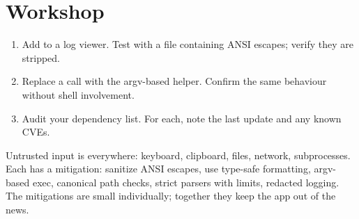 \section*{Workshop}

\begin{enumerate}[leftmargin=*]
  \item Add  to a log viewer. Test with a
    file containing ANSI escapes; verify they are stripped.
  \item Replace a  call with the argv-based
     helper. Confirm the same behaviour without
    shell involvement.
  \item Audit your dependency list. For each, note the last
    update and any known CVEs.
\end{enumerate}

\begin{recap}
Untrusted input is everywhere: keyboard, clipboard, files,
network, subprocesses. Each has a mitigation: sanitize ANSI
escapes, use type-safe formatting, argv-based exec, canonical
path checks, strict parsers with limits, redacted logging. The
mitigations are small individually; together they keep the app
out of the news.
\end{recap}
